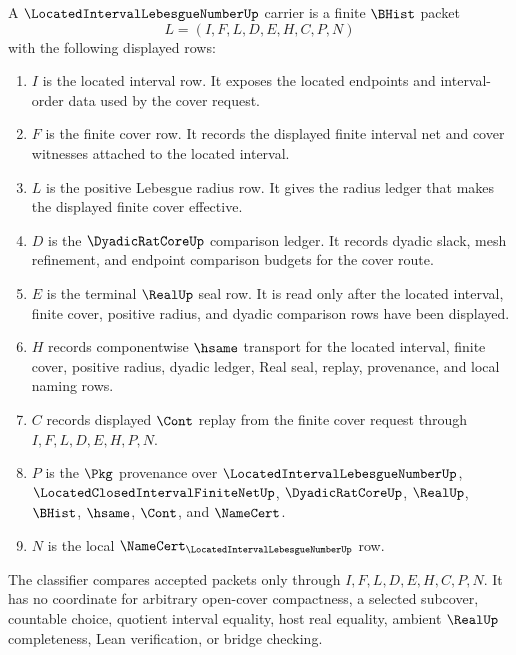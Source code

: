 \begin{definition}
\label{def:located-interval-lebesgue-number-carrier}
A $\LocatedIntervalLebesgueNumberUp$ carrier is a finite $\BHist$ packet
$$
L=(I,F,L,D,E,H,C,P,N)
$$
with the following displayed rows:
\begin{enumerate}
\item $I$ is the located interval row. It exposes the located endpoints and interval-order data used by the cover request.
\item $F$ is the finite cover row. It records the displayed finite interval net and cover witnesses attached to the located interval.
\item $L$ is the positive Lebesgue radius row. It gives the radius ledger that makes the displayed finite cover effective.
\item $D$ is the $\DyadicRatCoreUp$ comparison ledger. It records dyadic slack, mesh refinement, and endpoint comparison budgets for the cover route.
\item $E$ is the terminal $\RealUp$ seal row. It is read only after the located interval, finite cover, positive radius, and dyadic comparison rows have been displayed.
\item $H$ records componentwise $\hsame$ transport for the located interval, finite cover, positive radius, dyadic ledger, Real seal, replay, provenance, and local naming rows.
\item $C$ records displayed $\Cont$ replay from the finite cover request through $I,F,L,D,E,H,P,N$.
\item $P$ is the $\Pkg$ provenance over $\LocatedIntervalLebesgueNumberUp$, $\LocatedClosedIntervalFiniteNetUp$, $\DyadicRatCoreUp$, $\RealUp$, $\BHist$, $\hsame$, $\Cont$, and $\NameCert$.
\item $N$ is the local $\NameCert_{\LocatedIntervalLebesgueNumberUp}$ row.
\end{enumerate}
The classifier compares accepted packets only through $I,F,L,D,E,H,C,P,N$. It has no coordinate for arbitrary open-cover compactness, a selected subcover, countable choice, quotient interval equality, host real equality, ambient $\RealUp$ completeness, Lean verification, or bridge checking.
\end{definition}

